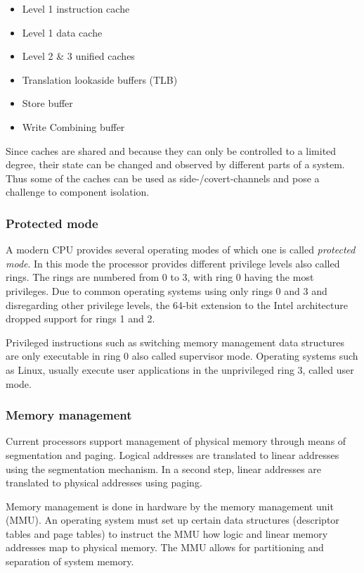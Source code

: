 \begin{itemize}
	\item Level 1 instruction cache
	\item Level 1 data cache
	\item Level 2 \& 3 unified caches
	\item Translation lookaside buffers (TLB)
	\item Store buffer
	\item Write Combining buffer
\end{itemize}

Since caches are shared and because they can only be controlled to a limited
degree, their state can be changed and observed by different parts of a system.
Thus some of the caches can be used as side-/covert-channels and pose a
challenge to component isolation.

\subsubsection{Protected mode}
A modern CPU provides several operating modes of which one is called
\emph{protected mode}. In this mode the processor provides different privilege
levels also called rings. The rings are numbered from 0 to 3, with ring 0 having
the most privileges. Due to common operating systems using only rings 0 and 3
and disregarding other privilege levels, the 64-bit extension to the Intel
architecture dropped support for rings 1 and 2.

Privileged instructions such as switching memory management data structures are
only executable in ring 0 also called supervisor mode. Operating systems such as
Linux, usually execute user applications in the unprivileged ring 3, called user
mode.

\subsubsection{Memory management}
Current processors support management of physical memory through means of
segmentation and paging. Logical addresses are translated to linear addresses
using the segmentation mechanism. In a second step, linear addresses are
translated to physical addresses using paging.

Memory management is done in hardware by the memory management unit (MMU).
An operating system must set up certain data structures (descriptor tables and
page tables) to instruct the MMU how logic and linear memory addresses map to
physical memory. The MMU allows for partitioning and separation of system
memory.

